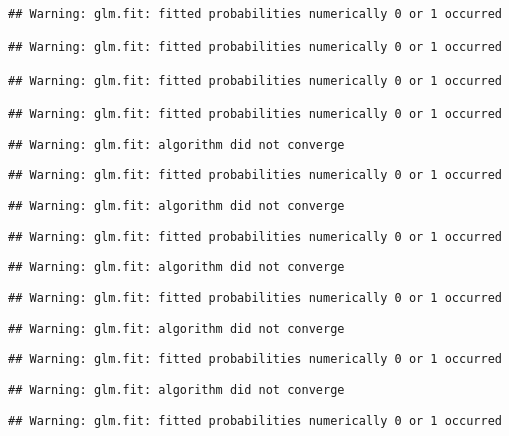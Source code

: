 \documentclass[
]{article}
\begin{document}
\begin{verbatim}
## Warning: glm.fit: fitted probabilities numerically 0 or 1 occurred

## Warning: glm.fit: fitted probabilities numerically 0 or 1 occurred

## Warning: glm.fit: fitted probabilities numerically 0 or 1 occurred

## Warning: glm.fit: fitted probabilities numerically 0 or 1 occurred
\end{verbatim}

\begin{verbatim}
## Warning: glm.fit: algorithm did not converge
\end{verbatim}

\begin{verbatim}
## Warning: glm.fit: fitted probabilities numerically 0 or 1 occurred
\end{verbatim}

\begin{verbatim}
## Warning: glm.fit: algorithm did not converge
\end{verbatim}

\begin{verbatim}
## Warning: glm.fit: fitted probabilities numerically 0 or 1 occurred
\end{verbatim}

\begin{verbatim}
## Warning: glm.fit: algorithm did not converge
\end{verbatim}

\begin{verbatim}
## Warning: glm.fit: fitted probabilities numerically 0 or 1 occurred
\end{verbatim}

\begin{verbatim}
## Warning: glm.fit: algorithm did not converge
\end{verbatim}

\begin{verbatim}
## Warning: glm.fit: fitted probabilities numerically 0 or 1 occurred
\end{verbatim}

\begin{verbatim}
## Warning: glm.fit: algorithm did not converge
\end{verbatim}

\begin{verbatim}
## Warning: glm.fit: fitted probabilities numerically 0 or 1 occurred
\end{verbatim}
\end{document}
